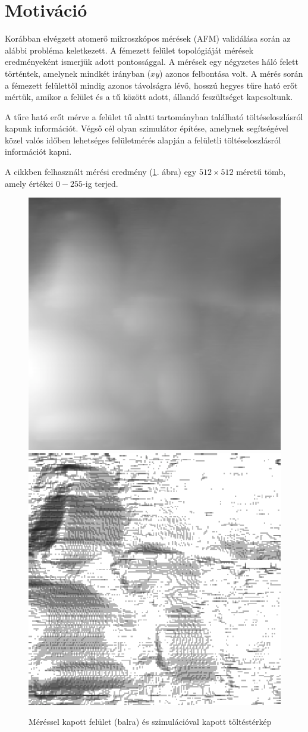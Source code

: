 
 
 \section{Motiváció} 
 
	Korábban elvégzett atomerő mikroszkópos mérések (AFM) validálása során az
	alábbi probléma keletkezett.
	A fémezett felület topológiáját mérések eredményeként ismerjük adott
	pontossággal.
	A mérések egy négyzetes háló felett történtek, amelynek mindkét irányban ($xy$)
	azonos felbontása volt.
	A mérés során a fémezett felülettől mindig azonos távolságra lévő, hosszú hegyes tűre ható erőt mértük,
	amikor a felület és a tű között adott, állandó feszültséget kapcsoltunk.
	
	A tűre ható erőt mérve a felület tű alatti tartományban található töltéseloszlásról kapunk információt.
	Végső cél olyan szimulátor építése, amelynek segítségével közel valós időben 
	lehetséges felületmérés alapján a felületli töltéseloszlásról információt
	kapni.
	
	A cikkben felhasznált mérési eredmény (\ref{fig:felulet}. ábra) egy
	$512\times512$ méretű tömb, amely értékei $0-255$-ig terjed.
	
	\begin{figure}[!h]
		\centering
		\includegraphics[width=0.45\columnwidth]{kepek/afm200.eps}
		\includegraphics[width=0.45\columnwidth]{kepek/efm200.eps}
		\caption{Méréssel kapott felület (balra) és szimulációval kapott töltéstérkép}
		\label{fig:felulet}
	\end{figure}
	
